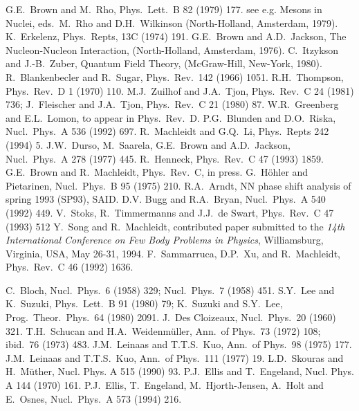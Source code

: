 \begin{thebibliography}{200}
 G.E.\ Brown and M.\ Rho, Phys.\ Lett.\  B 82 (1979) 177.
  see e.g. Mesons in Nuclei, eds.\ M.\ Rho
and D.H.\ Wilkinson
(North-Holland, Amsterdam, 1979).
 K.\ Erkelenz, Phys.\ Repts,  13C (1974) 191.
  G.E.\ Brown and A.D.\ Jackson,
The Nucleon-Nucleon Interaction,
(North-Holland, Amsterdam, 1976).
 C.\ Itzykson and J.-B.\ Zuber, Quantum Field Theory,
(McGraw-Hill, New-York, 1980).
 R.\ Blankenbecler and R.\ Sugar,
Phys.\ Rev.\  142 (1966) 1051.
 R.H.\ Thompson, Phys.\ Rev.\  D 1 (1970) 110.
 M.J.\ Zuilhof and J.A.\ Tjon,
Phys.\ Rev.\  C 24 (1981) 736;
J.\ Fleischer and J.A.\ Tjon, Phys.\ Rev.\  C 21 (1980) 87.
 W.R.\ Greenberg and E.L.\ Lomon, to appear in
Phys.\ Rev.\  D.
 P.G.\ Blunden and D.O.\ Riska,
Nucl.\ Phys.\  A 536 (1992) 697.
 R.\ Machleidt and G.Q.\ Li,
Phys.\ Repts  242 (1994) 5.
 J.W.\ Durso, M.\ Saarela, G.E.\ Brown and A.D.\ Jackson,
Nucl.\ Phys.\  A 278 (1977) 445.
 R.\ Henneck, Phys.\ Rev.\  C 47 (1993) 1859.
 G.E.\ Brown and R.\ Machleidt, Phys.\ Rev.\  C, in press.
 G.\ H\"{o}hler and Pietarinen, Nucl.\ Phys.\ B 95 (1975) 210.
 R.A.\ Arndt, NN phase shift analysis of spring 1993 (SP93),
SAID.
 D.V. Bugg and R.A.\ Bryan, Nucl.\ Phys.\ A 540 (1992) 449.
 V.\ Stoks, R.\ Timmermanns and J.J.\ de Swart,
Phys.\ Rev.\ C 47 (1993) 512
 Y.\ Song and R.\ Machleidt,
contributed paper submitted to the {\it 14th
International Conference
on Few Body Problems in Physics}, Williamsburg, Virginia,
USA, May 26-31, 1994.
 F.\ Sammarruca, D.P.\ Xu, and R.\ Machleidt, Phys.\ Rev.\
 C 46 (1992) 1636.




 C.\ Bloch, Nucl.\ Phys.\  6 (1958) 329;
Nucl.\ Phys.\  7 (1958) 451.
 S.Y.\ Lee and K.\ Suzuki, Phys.\ Lett.\  B 91 (1980) 79;
K.\ Suzuki and S.Y.\ Lee, Prog.\ Theor.\ Phys.\
 64 (1980) 2091.
\bibitem{des} J.\ Des Cloizeaux, Nucl.\ Phys.\  20 (1960) 321.
\bibitem{sw72} T.H.\ Schucan and H.A.\ Weidenm\"{u}ller, Ann.\ of Phys.\
 73 (1972) 108; ibid.\  76 (1973) 483.
\bibitem{lk75} J.M.\ Leinaas and T.T.S.\ Kuo, Ann.\ of Phys.\
 98 (1975) 177.
\bibitem{lk77} J.M.\ Leinaas and T.T.S.\ Kuo, Ann.\ of Phys.\
 111 (1977) 19.
\bibitem{sm90} L.D.\ Skouras and H.\ M\"{u}ther, Nucl. Phys.  A 515
(1990) 93.
\bibitem{ee70} P.J.\ Ellis and T.\ Engeland, Nucl. Phys.  A 144 (1970) 161.
\bibitem{eehho94} P.J.\ Ellis, T.\ Engeland,
M.\ Hjorth-Jensen, A.\ Holt and E.\ Osnes,
Nucl.\ Phys.\  A 573 (1994) 216.



\end{thebibliography}
